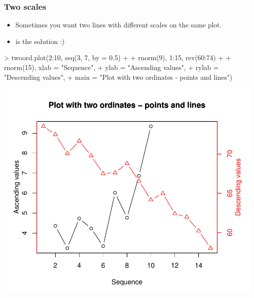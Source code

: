 \begin{frame}
  \frametitle{Two scales}
  \begin{itemize}
  \item Sometimes you want two lines with different scales on the same plot.
  \item {} is the solution :)
  \end{itemize}
\begin{Schunk}
\begin{Sinput}
> twoord.plot(2:10, seq(3, 7, by = 0.5) + 
+     rnorm(9), 1:15, rev(60:74) + 
+     rnorm(15), xlab = "Sequence", 
+     ylab = "Ascending values", 
+     rylab = "Descending values", 
+     main = "Plot with two ordinates - points and lines")
\end{Sinput}
\end{Schunk}
\includegraphics{plots/fig-033}
\end{frame}

